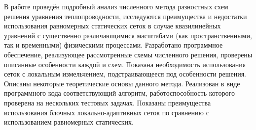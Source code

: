 В работе проведён подробный анализ численного метода разностных схем решения уравнения теплопроводности, исследуются преимущества и недостатки использования равномерных статических сеток в случае квазилинейных уравнений с существенно различающимися масштабами (как пространственными, так и временными) физическими процессами.
Разработано программное обеспечение, реализующее рассмотренные схемы численного решения, проверены описанные особенности каждой и схем.
Показана необходимость использования сеток с локальным измельчением, подстраивающееся под особенности решения.
Описаны некоторые теоретические основы данного метода.
Реализован в виде программного кода соответствующий алгоритм, работоспособность которого проверена на нескольких тестовых задачах.
Показаны преимущества использования блочных локально-адаптивных сеток по сравнению с использованием равномерных статических.